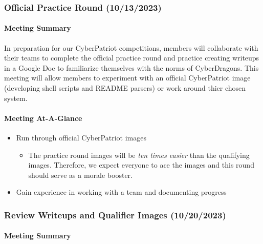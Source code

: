 \documentclass[
  letterpaper,
  DIV=11,
  numbers=noendperiod]{scrartcl}
\let\oldparagraph\paragraph
\renewcommand{\paragraph}[1]{\oldparagraph{#1}\mbox{}}
\providecommand{\tightlist}{%
  \setlength{\itemsep}{0pt}\setlength{\parskip}{0pt}}\usepackage{longtable,booktabs,array}
\begin{document}
\newpage{}

\hypertarget{official-practice-round-10132023}{%
\subsubsection{Official Practice Round
(10/13/2023)}\label{official-practice-round-10132023}}

\hypertarget{meeting-summary-4}{%
\paragraph{Meeting Summary}\label{meeting-summary-4}}

In preparation for our CyberPatriot competitions, members will
collaborate with their teams to complete the official practice round and
practice creating writeups in a Google Doc to familiarize themselves
with the norms of CyberDragons. This meeting will allow members to
experiment with an official CyberPatriot image (developing shell scripts
and README parsers) or work around thier chosen system.

\hypertarget{meeting-at-a-glance-4}{%
\paragraph{Meeting At-A-Glance}\label{meeting-at-a-glance-4}}

\begin{itemize}
\tightlist
\item
  Run through official CyberPatriot images

  \begin{itemize}
  \tightlist
  \item
    The practice round images will be \emph{ten times easier} than the
    qualifying images. Therefore, we expect everyone to ace the images
    and this round should serve as a morale booster.
  \end{itemize}
\item
  Gain experience in working with a team and documenting progress
\end{itemize}

\hypertarget{review-writeups-and-qualifier-images-10202023}{%
\subsubsection{Review Writeups and Qualifier Images
(10/20/2023)}\label{review-writeups-and-qualifier-images-10202023}}

\hypertarget{meeting-summary-5}{%
\paragraph{Meeting Summary}\label{meeting-summary-5}}
\end{document}
